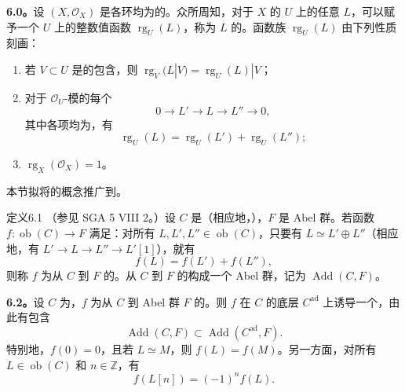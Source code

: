 \textbf{6.0。}设 $(X,\mathcal O_X)$ 是各环均为的。众所周知，对于 $X$ 的 $U$ 上的任意 $L$，可以赋予一个 $U$ 上的整数值函数 $\operatorname{rg}_U(L)$，称为 $L$ 的。函数族 $\operatorname{rg}_U(L)$ 由下列性质刻画：
\begin{enumerate}
\item[(i)] 若 $V\subset U$ 是的包含，则 $\operatorname{rg}_V(L|V)=\operatorname{rg}_U(L)|V$；
\item[(ii)] 对于 $\mathcal O_U$-模的每个
\[0\longrightarrow L'\longrightarrow L\longrightarrow L''\longrightarrow0,\]
其中各项均为，有
\[\operatorname{rg}_U(L)=\operatorname{rg}_U(L')+\operatorname{rg}_U(L'');\]
\item[(iii)] $\operatorname{rg}_X(\mathcal O_X)=1$。
\end{enumerate}
本节拟将的概念推广到。

\begin{SGAresult}{定义}{6.1}
（参见 SGA 5 VIII 2。）设 $C$ 是（相应地，），$F$ 是 Abel 群。若函数 $f:\operatorname{ob}(C)\to F$ 满足：对所有 $L,L',L''\in\operatorname{ob}(C)$，只要有 $L\simeq L'\oplus L''$（相应地，有 $L'\to L\to L''\to L'[1]$），就有
\[f(L)=f(L')+f(L''),\]
则称 $f$ 为从 $C$ 到 $F$ 的。从 $C$ 到 $F$ 的构成一个 Abel 群，记为 $\operatorname{Add}(C,F)$。
\end{SGAresult}

\textbf{6.2。}设 $C$ 为，$f$ 为从 $C$ 到 Abel 群 $F$ 的。则 $f$ 在 $C$ 的底层 $C^{\mathrm{ad}}$ 上诱导一个，由此有包含
\[\operatorname{Add}(C,F)\subset\operatorname{Add}(C^{\mathrm{ad}},F).\]
特别地，$f(0)=0$，且若 $L\simeq M$，则 $f(L)=f(M)$。另一方面，对所有 $L\in\operatorname{ob}(C)$ 和 $n\in\mathbb Z$，有
\[f(L[n])=(-1)^nf(L).\]

